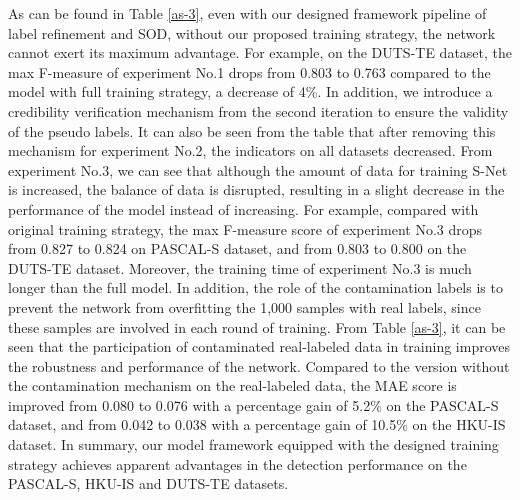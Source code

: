 \documentclass[journal]{IEEEtran}
\begin{document}
As can be found in Table \ref{as-3}, even with our designed framework pipeline of label refinement and SOD, without our proposed training strategy, the network cannot exert its maximum advantage. For example, on the DUTS-TE dataset, the max F-measure of experiment No.1 drops from 0.803 to 0.763 compared to the model with full training strategy, a decrease of 4\%.
In addition, we introduce a credibility verification mechanism from the second iteration to ensure the validity of the pseudo labels. It can also be seen from the table that after removing this mechanism for experiment No.2, the indicators on all datasets decreased.
 From experiment No.3, we can see that although the amount of data for training S-Net is increased, the balance of data is disrupted, resulting in a slight decrease in the performance of the model instead of increasing. For example, compared with original training strategy, the max F-measure score of experiment No.3 drops from 0.827 to 0.824 on PASCAL-S dataset, and from 0.803 to 0.800 on the DUTS-TE dataset. Moreover, the training time of experiment No.3 is much longer than the full model.
 In addition, the role of the contamination labels is to prevent the network from overfitting the 1,000 samples with real labels, since these samples are involved in each round of training. From Table \ref{as-3}, it can be seen that the participation of contaminated real-labeled data in training improves the robustness and performance of the network. Compared to the version without the contamination mechanism on the real-labeled data, the MAE score is improved from 0.080 to 0.076 with a percentage gain of 5.2\% on the PASCAL-S dataset, and from 0.042 to 0.038 with a percentage gain of 10.5\% on the HKU-IS dataset.
In summary, our model framework equipped with the designed training strategy achieves apparent advantages in the detection performance on the PASCAL-S, HKU-IS and DUTS-TE datasets.
\end{document}
